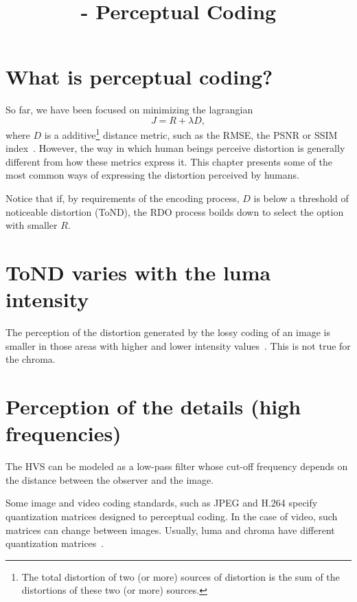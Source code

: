 

\title{\SM{} - Perceptual Coding}

\maketitle
\tableofcontents

\section{What is perceptual coding?}

So far, we have been focused on minimizing the lagrangian~\cite{sullivan1998rate}
\begin{equation}
  J = R + \lambda D,
\end{equation}
where $D$ is a additive\footnote{The total distortion of two (or more)
sources of distortion is the sum of the distortions of these two (or
more) sources.} distance metric, such as the RMSE, the PSNR or SSIM
index~\cite{wang2004image}. However, the way in which human beings
perceive distortion is generally different from how these metrics
express it. This chapter presents some of the most common ways of
expressing the distortion perceived by humans.

Notice that if, by requirements of the encoding process, $D$ is below
a threshold of noticeable distortion (ToND), the RDO process boilds down to
select the option with smaller $R$.

\section{ToND varies with the luma intensity}

The perception of the distortion generated by the lossy coding of an
image is smaller in those areas with higher and lower intensity
values~\cite{naccari2014perceptually}. This is not true for the chroma.

\section{Perception of the details (high frequencies)}
The HVS can be modeled as a low-pass filter whose cut-off frequency
depends on the distance between the observer and the image.

Some image and video coding standards, such as JPEG and H.264 specify
quantization matrices designed to perceptual coding. In the case of
video, such matrices can change between images. Usually, luma and
chroma have different quantization
matrices~\cite{naccari2014perceptually}.

